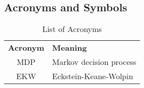 \subsection{Acronyms and Symbols}\label{List of Symbols}
\bgroup
\def\arraystretch{1.5}%
\tabulinesep=4.0mm
\begin{longtabu} to \textwidth{CL}
\caption{List of Acronyms}
\setlength\extrarowheight{0pt}\\ %
\bottomrule
\textbf{Acronym} & \textbf{Meaning} \\\midrule
\endhead
\bottomrule
\endfoot
MDP                 & Markov decision process \\
EKW                 & Eckstein-Keane-Wolpin
\end{longtabu}
\egroup
\newpage
\bgroup
\def\arraystretch{1.5}%
\tabulinesep=4.0mm
